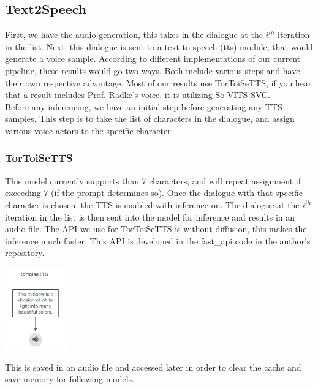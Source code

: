 \documentclass[conference]{IEEEtran}
\begin{document}
\subsection{Text2Speech}

First, we have the audio generation, this takes in the dialogue at the $i^{th}$ iteration in the list. Next, this dialogue is sent to a text-to-speech (tts) module, that would generate a voice sample. According to different implementations of our current pipeline, these results would go two ways. Both include various steps and have their own respective advantage. Most of our results use TorToiSeTTS, if you hear that a result includes Prof. Radke's voice, it is utilizing So-VITS-SVC. \\

Before any inferencing, we have an initial step before generating any TTS samples. This step is to take the list of characters in the dialogue, and assign various voice actors to the specific character.

\subsubsection{TorToiSeTTS}

This model currently supports than 7 characters, and will repeat assignment if exceeding 7 (if the prompt determines so). Once the dialogue with that specific character is chosen, the TTS is enabled with inference on. The dialogue at the $i^{th}$ iteration in the list is then sent into the model for inference and results in an audio file. The API we use for TorToiSeTTS is without diffusion, this makes the inference much faster. This API is developed in the fast\_api code in the author's repository. 

\begin{center}
\includegraphics[width=0.2\textwidth]{imgs/final-intermediate/ttts.png}\\
\end{center}

This is saved in an audio file and accessed later in order to clear the cache and save memory for following models.
\end{document}
